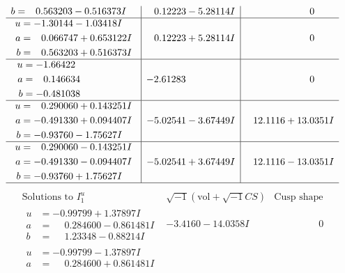\documentclass[1p]{elsarticle_modified}
\theoremstyle{definition}
\newcommand{\I}{\sqrt{-1}}
\begin{document}
$$\begin{array}{c|c|c}
\begin{aligned}
b &= \phantom{-}0.563203 - 0.516373 I\end{aligned}
 & \phantom{-}0.12223 - 5.28114 I & \phantom{-0.000000 } 0 \\ \hline\begin{aligned}
u &= -1.30144 - 1.03418 I \\
a &= \phantom{-}0.066747 + 0.653122 I \\
b &= \phantom{-}0.563203 + 0.516373 I\end{aligned}
 & \phantom{-}0.12223 + 5.28114 I & \phantom{-0.000000 } 0 \\ \hline\begin{aligned}
u &= -1.66422\phantom{ +0.000000I} \\
a &= \phantom{-}0.146634\phantom{ +0.000000I} \\
b &= -0.481038\phantom{ +0.000000I}\end{aligned}
 & -2.61283\phantom{ +0.000000I} & \phantom{-0.000000 } 0 \\ \hline\begin{aligned}
u &= \phantom{-}0.290060 + 0.143251 I \\
a &= -0.491330 + 0.094407 I \\
b &= -0.93760 - 1.75627 I\end{aligned}
 & -5.02541 - 3.67449 I & \phantom{-}12.1116 + 13.0351 I \\ \hline\begin{aligned}
u &= \phantom{-}0.290060 - 0.143251 I \\
a &= -0.491330 - 0.094407 I \\
b &= -0.93760 + 1.75627 I\end{aligned}
 & -5.02541 + 3.67449 I & \phantom{-}12.1116 - 13.0351 I\\
 \hline 
 \end{array}$$\newpage$$\begin{array}{c|c|c}  
\text{Solutions to }I^u_{1}& \I (\text{vol} + \sqrt{-1}CS) & \text{Cusp shape}\\
 \hline 
\begin{aligned}
u &= -0.99799 + 1.37897 I \\
a &= \phantom{-}0.284600 - 0.861481 I \\
b &= \phantom{-}1.23348 - 0.88214 I\end{aligned}
 & -3.4160 - 14.0358 I & \phantom{-0.000000 } 0 \\ \hline\begin{aligned}
u &= -0.99799 - 1.37897 I \\
a &= \phantom{-}0.284600 + 0.861481 I \\

\end{aligned}
\end{array}$$
\end{document}
